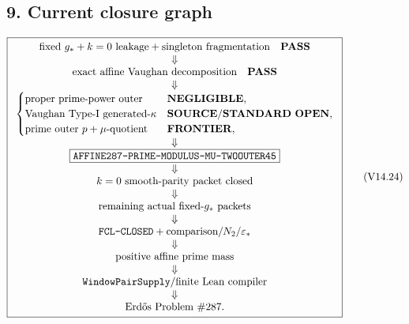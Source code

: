 \subsection*{9. Current closure graph}
\[
\boxed{\begin{array}{c}
\text{fixed }g_*+k=0\text{ leakage}+\text{singleton fragmentation}\quad\mathbf{PASS}\\
\Downarrow\\
\text{exact affine Vaughan decomposition}\quad\mathbf{PASS}\\
\Downarrow\\
\begin{cases}
\text{proper prime-power outer} & \mathbf{NEGLIGIBLE},\\
\text{Vaughan Type-I generated-}\kappa & \mathbf{SOURCE/STANDARD\ OPEN},\\
\text{prime outer }p+\mu\text{-quotient} & \mathbf{FRONTIER},
\end{cases}\\
\Downarrow\\
\boxed{\texttt{AFFINE287-PRIME-MODULUS-MU-TWOOUTER45}}\\
\Downarrow\\
k=0\text{ smooth-parity packet closed}\\
\Downarrow\\
\text{remaining actual fixed-}g_*\text{ packets}\\
\Downarrow\\
\texttt{FCL-CLOSED}+\text{comparison}/N_2/\varepsilon_*\\
\Downarrow\\
\text{positive affine prime mass}\\
\Downarrow\\
\texttt{WindowPairSupply}/\text{finite Lean compiler}\\
\Downarrow\\
\text{Erd\H{o}s Problem \#287}.
\end{array}}
\tag{V14.24}
\]

\begin{center}
\end{center}
\clearpage
